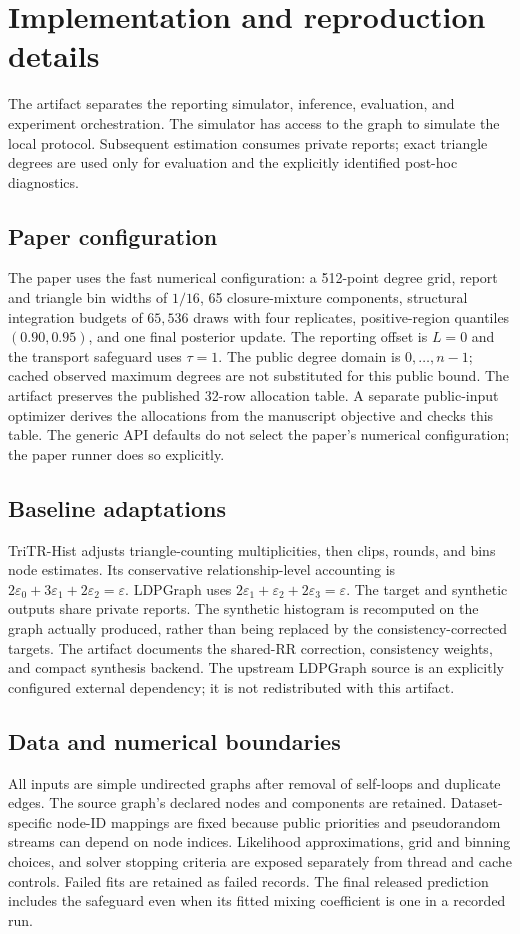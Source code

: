\clearpage
\section{Implementation and reproduction details}
The artifact separates the reporting simulator, inference, evaluation, and
experiment orchestration. The simulator has access to the graph to simulate
the local protocol. Subsequent estimation consumes private reports; exact
triangle degrees are used only for evaluation and the explicitly identified
post-hoc diagnostics.

\subsection*{Paper configuration}
The paper uses the fast numerical configuration: a 512-point degree grid,
report and triangle bin widths of $1/16$, 65 closure-mixture components,
structural integration budgets of $65{,}536$ draws with four replicates,
positive-region quantiles $(0.90,0.95)$, and one final posterior update.
The reporting offset is $L=0$ and the transport safeguard uses $\tau=1$.
The public degree domain is $0,\ldots,n-1$; cached observed maximum degrees
are not substituted for this public bound. The artifact preserves the
published 32-row allocation table. A separate public-input optimizer derives
the allocations from the manuscript objective and checks this table.
The generic API defaults do not select the paper's numerical configuration;
the paper runner does so explicitly.

\subsection*{Baseline adaptations}
TriTR-Hist adjusts triangle-counting multiplicities, then clips, rounds, and
bins node estimates. Its conservative relationship-level accounting is
$2\varepsilon_0+3\varepsilon_1+2\varepsilon_2=\varepsilon$.
LDPGraph uses $2\varepsilon_1+\varepsilon_2+2\varepsilon_3=\varepsilon$.
The target and synthetic outputs share private reports. The synthetic
histogram is recomputed on the graph actually produced, rather than being
replaced by the consistency-corrected targets. The artifact documents the
shared-RR correction, consistency weights, and compact synthesis backend.
The upstream LDPGraph source is an explicitly configured external dependency;
it is not redistributed with this artifact.

\subsection*{Data and numerical boundaries}
All inputs are simple undirected graphs after removal of self-loops and
duplicate edges. The source graph's declared nodes and components are retained.
Dataset-specific node-ID mappings are fixed because public priorities and
pseudorandom streams can depend on node indices. Likelihood approximations,
grid and binning choices, and solver stopping criteria are exposed separately
from thread and cache controls. Failed fits are retained as failed records.
The final released prediction includes the safeguard even when its fitted
mixing coefficient is one in a recorded run.

